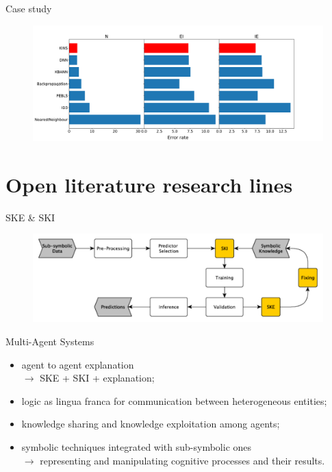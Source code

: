 \documentclass[presentation]{beamer}\mode<presentation>{\usetheme{AMSBolognaFC}}
\begin{document}
\begin{frame}{Case study}
    \framebreak
    
    \begin{figure}
        \centering
        \includegraphics[width=\textwidth]{figures/kins-error-rate}
    \end{figure}

\end{frame}


\section{Open literature research lines}


\begin{frame}[c]{SKE \& SKI}
    \begin{figure}
        \centering
        \includegraphics[width=\textwidth]{figures/ske-ski-workflow}
    \end{figure}
\end{frame}


\begin{frame}[c]{Multi-Agent Systems}
    \begin{itemize}
        \item agent to agent explanation \\
        $\rightarrow$ SKE + SKI + explanation;
        \item logic as lingua franca for communication between heterogeneous entities;
        \item knowledge sharing and knowledge exploitation among agents;
        \item symbolic techniques integrated with sub-symbolic ones\\
        $\rightarrow$ representing and manipulating cognitive
        processes and their results.
    \end{itemize}
\end{frame}
\end{document}
